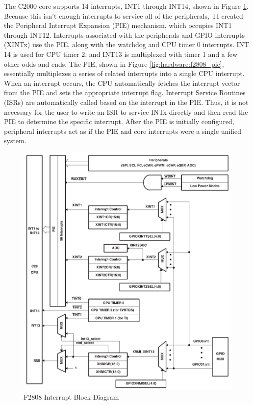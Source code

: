 The C2000 core supports 14 interrupts, INT1 through INT14, shown in Figure \ref{fig:hardware:f2808_interrupts_block_diagram}. Because this isn't enough interrupts to service all of the peripherals, TI created the Peripheral Interrupt Expansion (PIE) mechanism, which occupies INT1 through INT12. Interrupts associated with the peripherals and GPIO interrupts (XINTx) use the PIE, along with the watchdog and CPU timer 0 interrupts. INT 14 is used for CPU timer 2, and INT13 is multiplexed with timer 1 and a few other odds and ends. The PIE, shown in Figure \ref{fig:hardware:f2808_pie}, essentially multiplexes a series of related interrupts into a single CPU interrupt. When an interrupt occurs, the CPU automatically fetches the interrupt vector from the PIE and sets the appropriate interrupt flag. Interrupt Service Routines (ISRs) are automatically called based on the interrupt in the PIE. Thus, it is not necessary for the user to write an ISR to service INTx directly and then read the PIE to determine the specific interrupt. After the PIE is initially configured, peripheral interrupts act as if the PIE and core interrupts were a single unified system.\cite{ref:2006-ti-f2808_system_control_and_interrupts}

\begin{figure}[ptb]
	\begin{centering}
		\includegraphics[scale=0.75]{Hardware/Figures/hardware-f2808_interrupts_block_diagram.pdf}
		\caption[F2808 Interrupt Block Diagram]{F2808 Interrupt Block Diagram \cite{ref:2006-ti-f2808_system_control_and_interrupts}}
		\label{fig:hardware:f2808_interrupts_block_diagram}
	\end{centering}
\end{figure}


